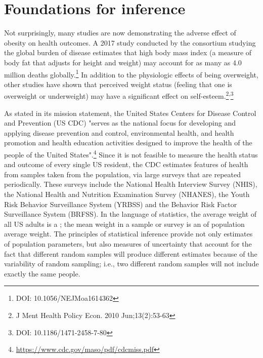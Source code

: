 

\chapter{Foundations for inference}
\label{foundationsForInference}

Not surprisingly, many studies are now demonstrating the adverse effect of obesity on health outcomes. A 2017 study conducted by the consortium studying the global burden of disease estimates that high body mass index (a measure of body fat that adjusts for height and weight) may account for as many as 4.0 million deaths globally.\footnote{DOI: 10.1056/NEJMoa1614362}  In addition to the physiologic effects of being overweight, other studies have shown that perceived weight status (feeling that one is overweight or underweight) may have a significant effect on self-esteem.\footnote{J Ment Health Policy Econ. 2010 Jun;13(2):53-63}\textsuperscript{,}\footnote{DOI: 10.1186/1471-2458-7-80}  

As stated in its mission statement, the United States Centers for Disease Control and Prevention (US CDC) "serves as
the national focus for developing and applying disease prevention and control, environmental health, and health
promotion and health education activities designed to improve the health of the people of the United
States".\footnote{\url{https://www.cdc.gov/maso/pdf/cdcmiss.pdf}} Since it is not feasible to measure the health
status and outcome of every single US resident, the CDC estimates features of health from samples taken from the population, via large surveys that are repeated periodically. These surveys include the National Health Interview Survey
(NHIS), the National Health and Nutrition Examination Survey (NHANES), the Youth Risk Behavior Surveillance System (YRBSS) and the Behavior Risk Factor Surveillance System (BRFSS).  In the language of statistics, the average weight of all US adults is a ; the mean weight in a sample or survey is an  of population average weight.  The principles of statistical inference provide not only estimates of population parameters, but also measures of uncertainty that account for the fact that different random samples will produce different estimates because of the variability of random sampling; i.e., two different random samples will not include exactly the same people.

